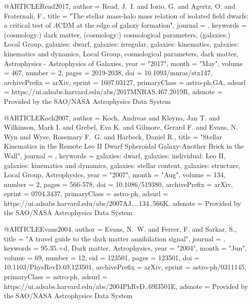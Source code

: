 \documentclass[apj]{emulateapj}
\begin{document}
{{{{{{{{@ARTICLE{Read2017,
       author = {{Read}, J.~I. and {Iorio}, G. and {Agertz}, O. and {Fraternali}, F.},
        title = "{The stellar mass-halo mass relation of isolated field dwarfs: a critical test of {\ensuremath{\Lambda}}CDM at the edge of galaxy formation}",
      journal = {\mnras},
     keywords = {(cosmology:) dark matter, (cosmology:) cosmological parameters, (galaxies:) Local Group, galaxies: dwarf, galaxies: irregular, galaxies: kinematics, galaxies: kinematics and dynamics, Local Group, cosmological parameters, dark matter, Astrophysics - Astrophysics of Galaxies},
         year = "2017",
        month = "May",
       volume = {467},
       number = {2},
        pages = {2019-2038},
          doi = {10.1093/mnras/stx147},
archivePrefix = {arXiv},
       eprint = {1607.03127},
 primaryClass = {astro-ph.GA},
       adsurl = {https://ui.adsabs.harvard.edu/abs/2017MNRAS.467.2019R},
      adsnote = {Provided by the SAO/NASA Astrophysics Data System}
}




@ARTICLE{Koch2007,
       author = {{Koch}, Andreas and {Kleyna}, Jan T. and {Wilkinson}, Mark I. and
         {Grebel}, Eva K. and {Gilmore}, Gerard F. and {Evans}, N. Wyn and
         {Wyse}, Rosemary F.~G. and {Harbeck}, Daniel R.},
        title = "{Stellar Kinematics in the Remote Leo II Dwarf Spheroidal Galaxy-Another Brick in the Wall}",
      journal = {\aj},
     keywords = {galaxies: dwarf, galaxies: individual: Leo II, galaxies: kinematics and dynamics, galaxies: stellar content, galaxies: structure, Local Group, Astrophysics},
         year = "2007",
        month = "Aug",
       volume = {134},
       number = {2},
        pages = {566-578},
          doi = {10.1086/519380},
archivePrefix = {arXiv},
       eprint = {0704.3437},
 primaryClass = {astro-ph},
       adsurl = {https://ui.adsabs.harvard.edu/abs/2007AJ....134..566K},
      adsnote = {Provided by the SAO/NASA Astrophysics Data System}
}






@ARTICLE{Evans2004,
       author = {{Evans}, N.~W. and {Ferrer}, F. and {Sarkar}, S.},
        title = "{A travel guide to the dark matter annihilation signal}",
      journal = {\prd},
     keywords = {95.35.+d, Dark matter, Astrophysics},
         year = "2004",
        month = "Jun",
       volume = {69},
       number = {12},
          eid = {123501},
        pages = {123501},
          doi = {10.1103/PhysRevD.69.123501},
archivePrefix = {arXiv},
       eprint = {astro-ph/0311145},
 primaryClass = {astro-ph},
       adsurl = {https://ui.adsabs.harvard.edu/abs/2004PhRvD..69l3501E},
      adsnote = {Provided by the SAO/NASA Astrophysics Data System}
}



}}}}}}}}
\end{document}
